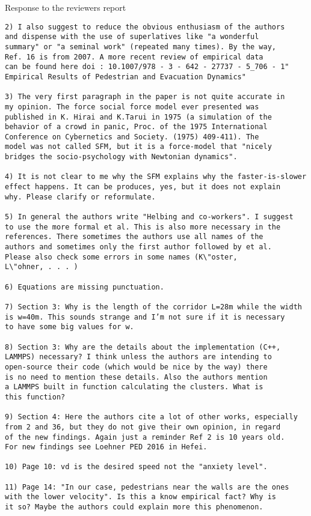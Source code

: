 \documentclass[a4paper,12pt]{letter}
\begin{document}
\begin{letter}{Response to the reviewers report}
\begin{verbatim}
2) I also suggest to reduce the obvious enthusiasm of the authors 
and dispense with the use of superlatives like "a wonderful 
summary" or "a seminal work" (repeated many times). By the way, 
Ref. 16 is from 2007. A more recent review of empirical data 
can be found here doi : 10.1007/978 - 3 - 642 - 27737 - 5_706 - 1"
Empirical Results of Pedestrian and Evacuation Dynamics"

3) The very first paragraph in the paper is not quite accurate in 
my opinion. The force social force model ever presented was 
published in K. Hirai and K.Tarui in 1975 (a simulation of the 
behavior of a crowd in panic, Proc. of the 1975 International 
Conference on Cybernetics and Society. (1975) 409-411). The 
model was not called SFM, but it is a force-model that "nicely 
bridges the socio-psychology with Newtonian dynamics".

4) It is not clear to me why the SFM explains why the faster-is-slower 
effect happens. It can be produces, yes, but it does not explain 
why. Please clarify or reformulate.

5) In general the authors write "Helbing and co-workers". I suggest 
to use the more formal et al. This is also more necessary in the 
references. There sometimes the authors use all names of the 
authors and sometimes only the first author followed by et al. 
Please also check some errors in some names (K\"oster, 
L\"ohner, . . . )

6) Equations are missing punctuation.

7) Section 3: Why is the length of the corridor L=28m while the width 
is w=40m. This sounds strange and I’m not sure if it is necessary 
to have some big values for w.

8) Section 3: Why are the details about the implementation (C++, 
LAMMPS) necessary? I think unless the authors are intending to 
open-source their code (which would be nice by the way) there 
is no need to mention these details. Also the authors mention 
a LAMMPS built in function calculating the clusters. What is
this function?

9) Section 4: Here the authors cite a lot of other works, especially 
from 2 and 36, but they do not give their own opinion, in regard 
of the new findings. Again just a reminder Ref 2 is 10 years old. 
For new findings see Loehner PED 2016 in Hefei.

10) Page 10: vd is the desired speed not the "anxiety level".

11) Page 14: "In our case, pedestrians near the walls are the ones 
with the lower velocity". Is this a know empirical fact? Why is 
it so? Maybe the authors could explain more this phenomenon. 


\end{verbatim}
\end{letter}
\end{document}
